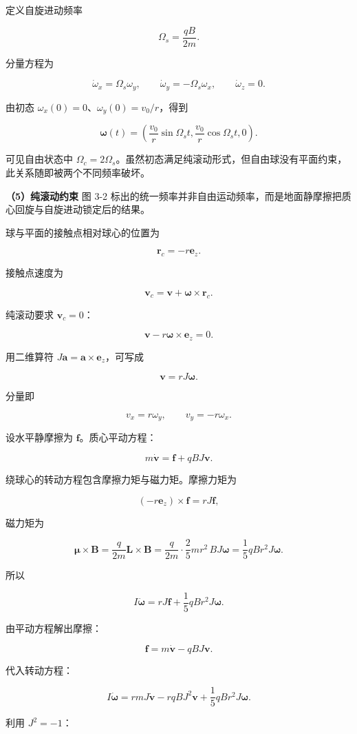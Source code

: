 \documentclass[12pt,a4paper,UTF8]{ctexart}
\begin{document}
定义自旋进动频率

\[\Omega_s=\frac{qB}{2m}.\]

分量方程为

\[\dot\omega_x=\Omega_s\omega_y,\qquad
\dot\omega_y=-\Omega_s\omega_x,\qquad
\dot\omega_z=0.\]

由初态 \(\omega_x(0)=0\)、\(\omega_y(0)=v_0/r\)，得到

\[\boxed{
\bm\omega(t)=
\left(
\frac{v_0}{r}\sin\Omega_st,
\frac{v_0}{r}\cos\Omega_st,
0
\right)
}.\]

可见自由状态中
\(\Omega_c=2\Omega_s\)。虽然初态满足纯滚动形式，但自由球没有平面约束，此关系随即被两个不同频率破坏。

\textbf{（5）纯滚动约束} 图 3-2
标出的统一频率并非自由运动频率，而是地面静摩擦把质心回旋与自旋进动锁定后的结果。

球与平面的接触点相对球心的位置为

\[\bm r_c=-r\bm e_z.\]

接触点速度为

\[\bm v_c=\bm v+\bm\omega\times\bm r_c.\]

纯滚动要求 \(\bm v_c=0\)：

\[\bm v-r\bm\omega\times\bm e_z=0.\]

用二维算符 \(J\bm a=\bm a\times\bm e_z\)，可写成

\[\boxed{\bm v=rJ\bm\omega}.\]

分量即

\[v_x=r\omega_y,\qquad v_y=-r\omega_x.\]

设水平静摩擦为 \(\bm f\)。质心平动方程：

\[m\dot{\bm v}=\bm f+qB J\bm v.\]

绕球心的转动方程包含摩擦力矩与磁力矩。摩擦力矩为

\[(-r\bm e_z)\times\bm f=rJ\bm f,\]

磁力矩为

\[\bm\mu\times\bm B
=\frac{q}{2m}\bm L\times\bm B
=\frac{q}{2m}\cdot\frac25mr^2\,B J\bm\omega
=\frac15qBr^2J\bm\omega.\]

所以

\[I\dot{\bm\omega}=rJ\bm f+\frac15qBr^2J\bm\omega.\]

由平动方程解出摩擦：

\[\bm f=m\dot{\bm v}-qBJ\bm v.\]

代入转动方程：

\[I\dot{\bm\omega}
=rmJ\dot{\bm v}-rqBJ^2\bm v+\frac15qBr^2J\bm\omega.\]

利用 \(J^2=-1\)：
\end{document}
